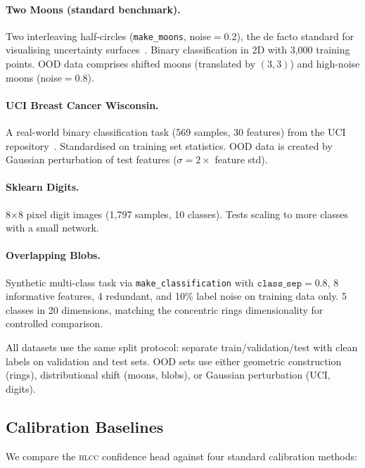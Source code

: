 \documentclass[11pt,a4paper]{article}
\newcommand{\hlcc}{\textsc{hlcc}}
\begin{document}
\paragraph{Two Moons (standard benchmark).}
Two interleaving half-circles (\texttt{make\_moons}, noise$=0.2$),
the de facto standard for visualising uncertainty
surfaces~\cite{liu2020simple}.  Binary classification in 2D with
3{,}000 training points.  OOD data comprises shifted moons
(translated by $(3,3)$) and high-noise moons (noise$=0.8$).

\paragraph{UCI Breast Cancer Wisconsin.}
A real-world binary classification task (569 samples, 30 features)
from the UCI repository~\cite{dua2019uci}.  Standardised on training
set statistics.  OOD data is created by Gaussian perturbation of test
features ($\sigma = 2\times$ feature std).

\paragraph{Sklearn Digits.}
8$\times$8 pixel digit images (1{,}797 samples, 10 classes).
Tests scaling to more classes with a small network.

\paragraph{Overlapping Blobs.}
Synthetic multi-class task via \texttt{make\_classification} with
$\texttt{class\_sep}=0.8$, 8 informative features, 4 redundant, and
10\% label noise on training data only.  5 classes in 20 dimensions,
matching the concentric rings dimensionality for controlled comparison.

All datasets use the same split protocol: separate train/validation/test
with clean labels on validation and test sets.  OOD sets use either
geometric construction (rings), distributional shift (moons, blobs),
or Gaussian perturbation (UCI, digits).

\subsection{Calibration Baselines}
\label{sec:baselines}

We compare the \hlcc{} confidence head against four standard
calibration methods:
\end{document}
